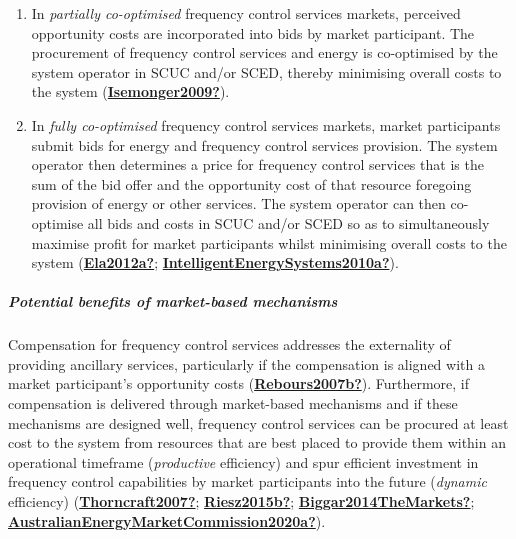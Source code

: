 \documentclass[12pt,a4paper,]{report}
\begin{document}
\begin{enumerate}
\def\labelenumi{\arabic{enumi}.}
\item
  In \emph{partially co-optimised} frequency control services markets,
  perceived opportunity costs are incorporated into bids by market
  participant. The procurement of frequency control services and energy
  is co-optimised by the system operator in SCUC and/or SCED, thereby
  minimising overall costs to the system
  (\protect\hyperlink{ref-Isemonger2009}{\textbf{Isemonger2009?}}).
\item
  In \emph{fully co-optimised} frequency control services markets,
  market participants submit bids for energy and frequency control
  services provision. The system operator then determines a price for
  frequency control services that is the sum of the bid offer and the
  opportunity cost of that resource foregoing provision of energy or
  other services. The system operator can then co-optimise all bids and
  costs in SCUC and/or SCED so as to simultaneously maximise profit for
  market participants whilst minimising overall costs to the system
  (\protect\hyperlink{ref-Ela2012a}{\textbf{Ela2012a?}};
  \protect\hyperlink{ref-IntelligentEnergySystems2010a}{\textbf{IntelligentEnergySystems2010a?}}).
\end{enumerate}

\hypertarget{potential-benefits-of-market-based-mechanisms}{%
\subparagraph{Potential benefits of market-based
mechanisms}\label{potential-benefits-of-market-based-mechanisms}}

Compensation for frequency control services addresses the externality of
providing ancillary services, particularly if the compensation is
aligned with a market participant's opportunity costs
(\protect\hyperlink{ref-Rebours2007b}{\textbf{Rebours2007b?}}).
Furthermore, if compensation is delivered through market-based
mechanisms and if these mechanisms are designed well, frequency control
services can be procured at least cost to the system from resources that
are best placed to provide them within an operational timeframe
(\emph{productive} efficiency) and spur efficient investment in
frequency control capabilities by market participants into the future
(\emph{dynamic} efficiency)
(\protect\hyperlink{ref-Thorncraft2007}{\textbf{Thorncraft2007?}};
\protect\hyperlink{ref-Riesz2015b}{\textbf{Riesz2015b?}};
\protect\hyperlink{ref-Biggar2014TheMarkets}{\textbf{Biggar2014TheMarkets?}};
\protect\hyperlink{ref-AustralianEnergyMarketCommission2020a}{\textbf{AustralianEnergyMarketCommission2020a?}}).
\end{document}
